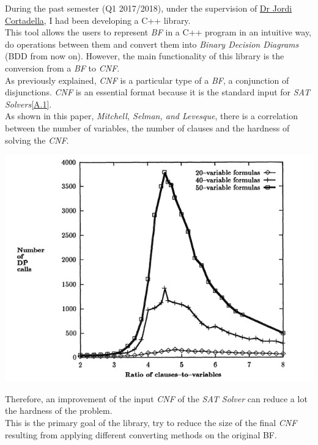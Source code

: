 During the past semester (Q1 2017/2018), under the supervision of \href{https://www.cs.upc.edu/~jordicf/}{Dr Jordi Cortadella}, I had been developing a C++ library.\\
This tool allows the users to represent \emph{BF} in a C++ program in an intuitive way, do operations between them and convert them into \emph{Binary Decision Diagrams} (BDD from now on). However, the main functionality of this library is the conversion from a \emph{BF} to \emph{CNF}.  \\
As previously explained, \emph{CNF} is a particular type of a \emph{BF}, a conjunction of disjunctions. \emph{CNF} is an essential format because it is the standard input for \emph{SAT Solvers}\ref{A.1}.\\
As shown in this paper, \emph{Mitchell, Selman, and Levesque\cite{Mitchell}}, there is a correlation between the number of variables, the number of clauses and the hardness of solving the \emph{CNF}.
\begin{center}
	\includegraphics[width=1\textwidth]{Figures/GraphMitchellSelmanLevesque.png}
\end{center}
Therefore, an improvement of the input \emph{CNF} of the \emph{SAT Solver} can reduce a lot the hardness of the problem. \\
This is the primary goal of the library, try to reduce the size of the final \emph{CNF} resulting from applying different converting methods on the original BF.

